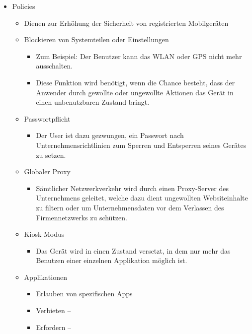 \begin{itemize}
	\item Policies
	\begin{itemize}
		\item Dienen zur Erhöhung der Sicherheit von registrierten Mobilgeräten
		\item Blockieren von Systemteilen oder Einstellungen
		\begin{itemize}
			\item Zum Beispiel: Der Benutzer kann das WLAN oder GPS nicht mehr ausschalten.
			\item Diese Funktion wird benötigt, wenn die Chance besteht, dass der Anwender durch gewollte oder ungewollte Aktionen das Gerät in einen unbenutzbaren Zustand bringt.
		\end{itemize}
		\item Passwortpflicht
		\begin{itemize}
			\item Der User ist dazu gezwungen, ein Passwort nach Unternehmensrichtlinien zum Sperren und Entsperren seines Gerätes zu setzen.
		\end{itemize}
		\item Globaler Proxy
		\begin{itemize}
			\item Sämtlicher Netzwerkverkehr wird durch einen Proxy-Server des Unternehmens geleitet, welche dazu dient ungewollten Websiteinhalte zu filtern oder um Unternehmensdaten vor dem Verlassen des Firmennetzwerks zu schützen.
		\end{itemize}
		\item Kiosk-Modus
		\begin{itemize}
			\item Das Gerät wird in einen Zustand versetzt, in dem nur mehr das Benutzen einer einzelnen Applikation möglich ist.
		\end{itemize}
		\item Applikationen
		\begin{itemize}
			\item Erlauben von spezifischen Apps
			\item Verbieten –
			\item Erfordern –
		\end{itemize}
	\end{itemize}
\end{itemize}


